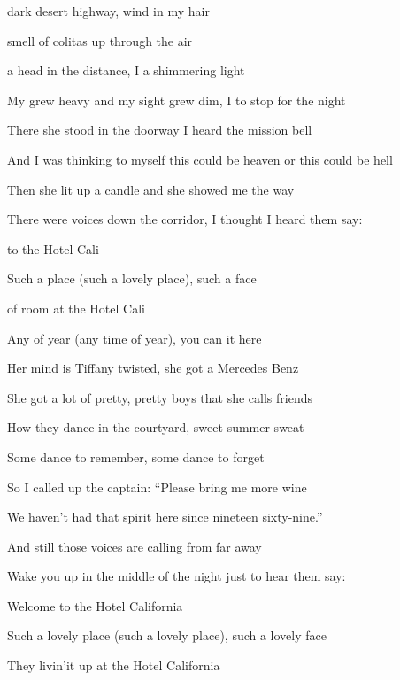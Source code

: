 

       

\zs
{} dark desert highway,
 wind in my hair

 smell of colitas
 up through the air

 a head in the distance,
I  a shimmering light

My  grew heavy and my sight grew dim,
I  to stop for the night
\ks

\zs
There she stood in the doorway
I heard the mission bell

And I was thinking to myself
this could be heaven or this could be hell

Then she lit up a candle
and she showed me the way

There were voices down the corridor,
I thought I heard them say:
\ks

\zr
{} to the Hotel Cali

Such a  place (such a lovely place),
such a  face

 of room at the Hotel Cali

Any  of year (any time of year),
you can  it here
\kr

\zs
Her mind is Tiffany twisted,
she got a Mercedes Benz

She got a lot of pretty,
pretty boys that she calls friends

How they dance in the courtyard,
sweet summer sweat

Some dance to remember,
some dance to forget
\ks

\zs
So I called up the captain:
``Please bring me more wine

We haven't had that spirit
here since nineteen sixty-nine.''

And still those voices are calling from far away

Wake you up in the middle of the night
just to hear them say:
\ks

\zr
Welcome to the Hotel California

Such a lovely place (such a lovely place),
such a lovely face

They livin'it up at the Hotel California

